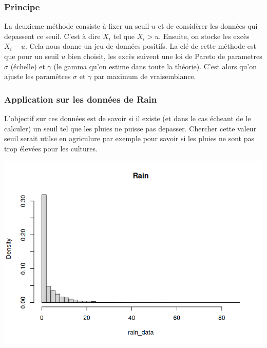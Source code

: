 \documentclass{article}
\begin{document}
\subsubsection{Principe}

La deuxieme méthode consiste à fixer un seuil $u$ et de considèrer les données qui depassent ce seuil. C'est à dire $X_i$ tel que $X_i > u$.
Ensuite, on stocke les excès $X_i - u$. Cela nous donne un jeu de données positifs.
La clé de cette méthode est que pour un seuil $u$ bien choisit, les excès suivent une loi de Pareto de parametres $\sigma$ (échelle) et $\gamma$ (le gamma qu'on estime dans toute la théorie).
C'est alors qu'on ajuste les paramêtres $\sigma$ et $\gamma$ par maximum de vraisemblance.

\subsubsection{Application sur les données de Rain}

L'objectif sur ces données est de savoir si il existe (et dans le cas écheant de le calculer) un seuil tel que les pluies ne puisse pas depasser.
Chercher cette valeur seuil serait utilse en agriculure par exemple pour savoir si les pluies ne sont pas trop élevées pour les cultures.

\begin{center}
	\includegraphics[scale=0.8]{./images/rainhisto.png} 
\end{center}
\end{document}
